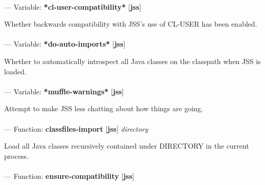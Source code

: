 \paragraph{}
\label{JSS:*CL-USER-COMPATIBILITY*}
--- Variable: \textbf{*cl-user-compatibility*} [\textbf{jss}] \textit{}

\begin{adjustwidth}{5em}{5em}
Whether backwards compatibility with JSS's use of CL-USER has been enabled.
\end{adjustwidth}

\paragraph{}
\label{JSS:*DO-AUTO-IMPORTS*}
--- Variable: \textbf{*do-auto-imports*} [\textbf{jss}] \textit{}

\begin{adjustwidth}{5em}{5em}
Whether to automatically introspect all Java classes on the classpath when JSS is loaded.
\end{adjustwidth}

\paragraph{}
\label{JSS:*MUFFLE-WARNINGS*}
--- Variable: \textbf{*muffle-warnings*} [\textbf{jss}] \textit{}

\begin{adjustwidth}{5em}{5em}
Attempt to make JSS less chatting about how things are going.
\end{adjustwidth}

\paragraph{}
\label{JSS:CLASSFILES-IMPORT}
--- Function: \textbf{classfiles-import} [\textbf{jss}] \textit{directory}

\begin{adjustwidth}{5em}{5em}
Load all Java classes recursively contained under DIRECTORY in the current process.
\end{adjustwidth}

\paragraph{}
\label{JSS:ENSURE-COMPATIBILITY}
--- Function: \textbf{ensure-compatibility} [\textbf{jss}] \textit{}

